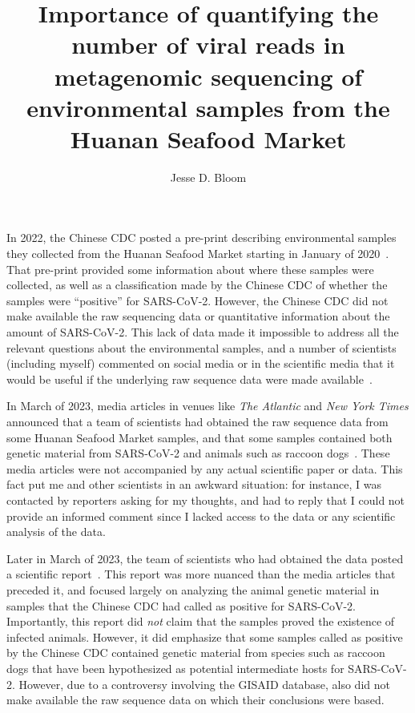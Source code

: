 \documentclass[9pt,onecolumn,twoside]{gsajnl_modified}
\title{Importance of quantifying the number of viral reads in metagenomic sequencing of environmental samples from the Huanan Seafood Market}
\author[]{\Large Jesse D. Bloom}
\affil[]{Fred Hutchinson Cancer Center; Howard Hughes Medical Institute

}
\begin{document}
\maketitle
\thispagestyle{firststyle}
\firstpagefootnote

\vspace{-33pt}%

\lettrine[lines=2]{\color{color2}I}{}n 2022, the Chinese CDC posted a pre-print describing environmental samples they collected from the Huanan Seafood Market starting in January of 2020~\citep{liu2022surveillance}.
That pre-print provided some information about where these samples were collected, as well as a classification made by the Chinese CDC of whether the samples were ``positive'' for SARS-CoV-2.
However, the Chinese CDC did not make available the raw sequencing data or quantitative information about the amount of SARS-CoV-2.
This lack of data made it impossible to address all the relevant questions about the environmental samples, and a number of scientists (including myself) commented on social media or in the scientific media that it would be useful if the underlying raw sequence data were made available~\citep{cohen2022studies, cohen2022anywhere}.

In March of 2023, media articles in venues like \textit{The Atlantic} and \textit{New York Times} announced that a team of scientists had obtained the raw sequence data from some Huanan Seafood Market samples, and that some samples contained both genetic material from SARS-CoV-2 and animals such as raccoon dogs~\citep{wu2023atlantic, mueller2023nytimes}.
These media articles were not accompanied by any actual scientific paper or data.
This fact put me and other scientists in an awkward situation: for instance, I was contacted by reporters asking for my thoughts, and had to reply that I could not provide an informed comment since I lacked access to the data or any scientific analysis of the data.

Later in March of 2023, the team of scientists who had obtained the data posted a scientific report~\citep{crits2023genetic}.
This report was more nuanced than the media articles that preceded it, and focused largely on analyzing the animal genetic material in samples that the Chinese CDC had called as positive for SARS-CoV-2.
Importantly, this report did \emph{not} claim that the samples proved the existence of infected animals.
However, it did emphasize that some samples called as positive by the Chinese CDC contained genetic material from species such as raccoon dogs that have been hypothesized as potential intermediate hosts for SARS-CoV-2.
However, due to a controversy involving the GISAID database, \citet{crits2023genetic} also did not make available the raw sequence data on which their conclusions were based.
\end{document}
